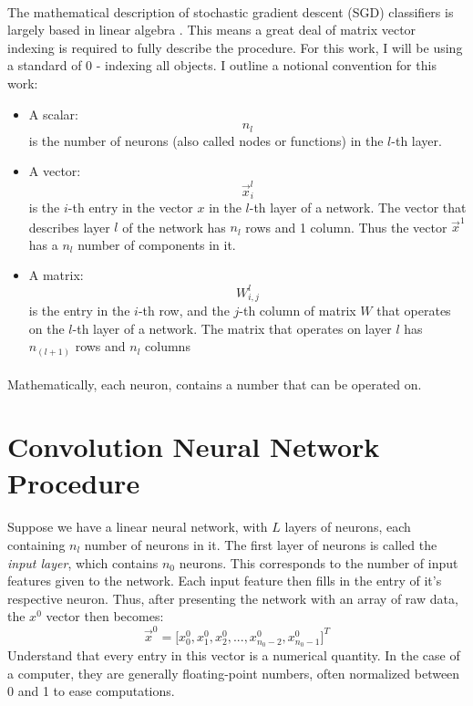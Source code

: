 \documentclass[12pt,letterpaper]{article}
\begin{document}
\paragraph*{}The mathematical description of stochastic gradient descent (SGD) classifiers is largely based in linear algebra \cite{Goodfellow}. This means a great deal of matrix vector indexing is required to fully describe the procedure. For this work, I will be using a standard of $0$ - indexing all objects. I outline a notional convention for this work:
\begin{itemize}
\item A scalar:
\begin{equation}
n_l
\end{equation} 
is the number of neurons (also called nodes or functions) in the 
$l$-th layer. 
\item A vector:
\begin{equation}
\vec{x}_{i}^{l}
\end{equation}
is the $i$-th entry in the vector $x$ in the $l$-th layer of a network. The vector that describes layer $l$ of the network has $n_l$ rows and 1 column. Thus the vector $\vec{x}^1$ has a $n_l$ number of components in it.
\item A matrix:
\begin{equation}
W_{i,j}^{l}
\end{equation}
is the entry in the $i$-th row, and the $j$-th column of matrix $W$ that operates on the $l$-th layer of a network. The matrix that operates on layer $l$ has $n_{(l+1)}$ rows and $n_{l}$ columns
\end{itemize}
\paragraph*{}Mathematically, each neuron, contains a number that can be operated on. 


\section{Convolution Neural Network Procedure}
\paragraph*{}Suppose we have a linear neural network, with $L$ layers of neurons, each containing $n_l$ number of neurons in it. The first layer of neurons is called the \textit{input layer}, which contains $n_0$ neurons. This corresponds to the number of input features given to the network. Each input feature then fills in the entry of it's respective neuron. Thus, after presenting the network with an array of raw data, the $x^0$ vector then becomes:
\begin{equation}
\label{layer0}
\vec{x}^0 = \big[ x^0_0 , x^0_1 , x^0_2 , ... , 
x^0_{n_0-2} , x^0_{n_0-1} \big]^T  
\end{equation} 
Understand that every entry in this vector is a numerical quantity. In the case of a computer, they are generally floating-point numbers, often normalized between 0 and 1 to ease computations. 
\end{document}
